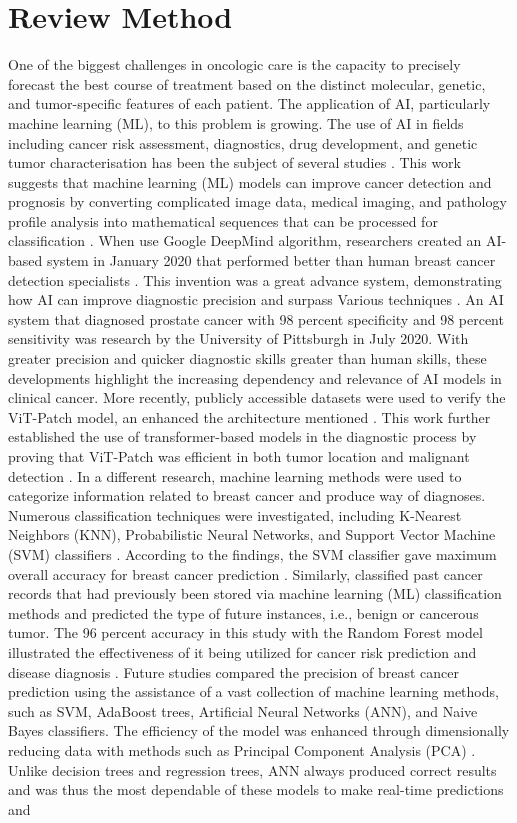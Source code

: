 \documentclass[conference]{IEEEtran}
\begin{document}
\section{Review Method}

One of the biggest challenges in oncologic care is the capacity to precisely forecast the best course of treatment based on the distinct molecular, genetic, and tumor-specific features of each patient. The application of AI, particularly machine learning (ML), to this problem is growing. The use of AI in fields including cancer risk assessment, diagnostics, drug development, and genetic tumor characterisation has been the subject of several studies \cite{1,8}. This work suggests that machine learning (ML) models can improve cancer detection and prognosis by converting complicated image data, medical imaging, and pathology profile analysis into mathematical sequences that can be processed for classification \cite{9}.  When use Google DeepMind algorithm, researchers created an AI-based system in January 2020 that performed better than human breast cancer detection specialists \cite{23}. This invention was a great advance system, demonstrating how AI can improve diagnostic precision and surpass Various techniques \cite{4}. An AI system that diagnosed prostate cancer with 98 percent specificity and 98 percent sensitivity was research by the University of Pittsburgh in July 2020\cite{6}. With greater precision and quicker diagnostic skills greater than human skills, these developments highlight the increasing dependency and relevance of AI models in clinical cancer. More recently, publicly accessible datasets were used to verify the ViT-Patch model, an enhanced the architecture mentioned \cite{2,14}. This work further established the use of transformer-based models in the diagnostic process by proving that ViT-Patch was efficient in both tumor location and malignant detection \cite{14}. In a different research, machine learning methods were used to categorize information related to breast cancer and produce way of diagnoses. Numerous classification techniques were investigated, including K-Nearest Neighbors (KNN), Probabilistic Neural Networks, and Support Vector Machine (SVM) classifiers \cite{16}. According to the findings, the SVM classifier gave maximum overall accuracy for breast cancer prediction \cite{17}. Similarly, \cite{21} classified past cancer records that had previously been stored via machine learning (ML) classification methods and predicted the type of future instances, i.e., benign or cancerous tumor. The 96 percent accuracy in this study with the Random Forest model illustrated the effectiveness of it being utilized for cancer risk prediction and disease diagnosis \cite{22}. Future studies compared the precision of breast cancer prediction using the assistance of a vast collection of machine learning methods, such as SVM, AdaBoost trees, Artificial Neural Networks (ANN), and Naive Bayes classifiers. The efficiency of the model was enhanced through dimensionally reducing data with methods such as Principal Component Analysis (PCA) \cite{20, 21, 22}. Unlike decision trees and regression trees, ANN always produced correct results and was thus the most dependable of these models to make real-time predictions and 
\end{document}
